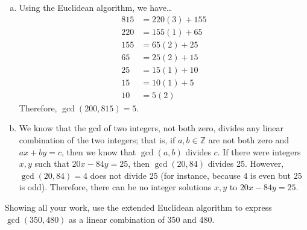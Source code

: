 \documentclass[11pt,letterpaper]{article}
\begin{document}
\sol 
\begin{enumerate}[(a)]
\item Using the Euclidean algorithm, we have\dots
	\[
	\begin{aligned}
	815&= 220(3) + 155 \\[0.3cm]
	220&= 155(1) + 65 \\[0.3cm]
	155&= 65(2) + 25 \\[0.3cm]
	65&= 25(2) + 15 \\[0.3cm]
	25&= 15(1) + 10 \\[0.3cm]
	15&= 10(1) + 5 \\[0.3cm]
	10&= 5(2)
	\end{aligned}
	\]
Therefore, $\gcd(200, 815)= 5$. \pspace

\item We know that the gcd of two integers, not both zero, divides any linear combination of the two integers; that is, if $a, b \in \mathbb{Z}$ are not both zero and $ax + by= c$, then we know that $\gcd(a, b)$ divides $c$. If there were integers $x, y$ such that $20x - 84y= 25$, then $\gcd(20, 84)$ divides 25. However, $\gcd(20, 84)= 4$ does not divide 25 (for instance, because 4 is even but 25 is odd). Therefore, there can be no integer solutions $x, y$ to $20x - 84y= 25$. 
\end{enumerate}



\newpage



 Showing all your work, use the extended Euclidean algorithm to express $\gcd(350, 480)$ as a linear combination of 350 and 480. \pspace
\end{document}
